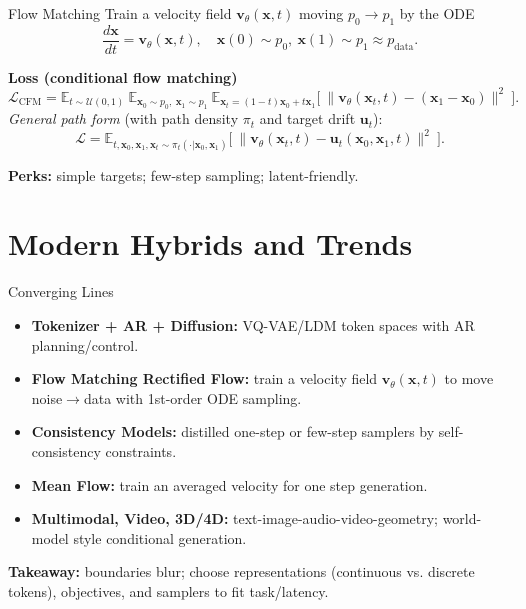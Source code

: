 \documentclass[aspectratio=169]{beamer}
\begin{document}
\begin{frame}{Flow Matching}
  \small
  Train a velocity field $\mathbf{v}_\theta(\mathbf{x},t)$ moving $p_0\to p_1$ by the ODE
  \[
    \frac{d\mathbf{x}}{dt}=\mathbf{v}_\theta(\mathbf{x},t),\quad
    \mathbf{x}(0)\sim p_0,\ \mathbf{x}(1)\sim p_1\approx p_{\text{data}}.
  \]
  
  \textbf{Loss (conditional flow matching)}
  \[
    \mathcal{L}_{\mathrm{CFM}}
    = \mathbb{E}_{t\sim\mathcal{U}(0,1)}
      \ \mathbb{E}_{\mathbf{x}_0\sim p_0,\ \mathbf{x}_1\sim p_1}
      \ \mathbb{E}_{\mathbf{x}_t=(1-t)\mathbf{x}_0+t\mathbf{x}_1}
      \Big[\ \|\mathbf{v}_\theta(\mathbf{x}_t,t)-(\mathbf{x}_1-\mathbf{x}_0)\|^2\ \Big].
  \]
  \textit{General path form} (with path density $\pi_t$ and target drift $\mathbf{u}_t$):
  \[
    \mathcal{L}
    = \mathbb{E}_{t,\mathbf{x}_0,\mathbf{x}_1,\mathbf{x}_t\sim \pi_t(\cdot|\mathbf{x}_0,\mathbf{x}_1)}
      \Big[\ \|\mathbf{v}_\theta(\mathbf{x}_t,t)-\mathbf{u}_t(\mathbf{x}_0,\mathbf{x}_1,t)\|^2\ \Big].
  \]
  
  \textbf{Perks:} simple targets; few-step sampling; latent-friendly.
  \end{frame}

\section{Modern Hybrids and Trends}

\begin{frame}{Converging Lines}
\begin{itemize}
  \item \textbf{Tokenizer + AR + Diffusion:} VQ-VAE/LDM token spaces with AR planning/control.
  \item \textbf{Flow Matching \/ Rectified Flow:} train a velocity field $\mathbf{v}_\theta(\mathbf{x},t)$ to move noise$\to$data with 1st-order ODE sampling.
  \item \textbf{Consistency Models:} distilled one-step or few-step samplers by self-consistency constraints.
  \item \textbf{Mean Flow:} train an averaged velocity for one step generation.
  \item \textbf{Multimodal, Video, 3D/4D:} text-image-audio-video-geometry; world-model style conditional generation.
\end{itemize}
\vspace{0.3em}
\textbf{Takeaway:} boundaries blur; choose representations (continuous vs. discrete tokens), objectives, and samplers to fit task/latency.
\end{frame}
\end{document}
